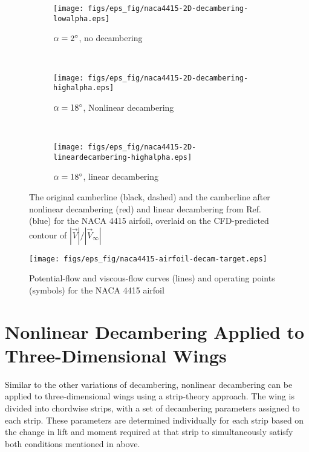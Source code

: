 \begin{figure*}[ht!]
    \centering
    \begin{subfigure}[t]{0.45\textwidth}
        \centering
        \texttt{[image: figs/eps\_fig/naca4415-2D-decambering-lowalpha.eps]}
        \caption{$\alpha = 2^\circ{}$, no decambering\label{sfig:nld-lowalpha}}
    \end{subfigure}
    ~
    \begin{subfigure}[t]{0.45\textwidth}
        \centering
        \texttt{[image: figs/eps\_fig/naca4415-2D-decambering-highalpha.eps]}
        \caption{$\alpha = 18^\circ{}$, Nonlinear decambering\label{sfig:nld-highalpha}}
    \end{subfigure}%
    ~
    \begin{subfigure}[t]{0.45\textwidth}
        \centering
        \texttt{[image: figs/eps\_fig/naca4415-2D-lineardecambering-highalpha.eps]}
        \caption{$\alpha = 18^\circ{}$, linear decambering\label{sfig:nld-linhighalpha}}
    \end{subfigure}
    \caption{The original camberline (black, dashed) and the camberline after nonlinear decambering (red) and linear decambering from Ref. \cite{Paul_Gopa_Iteration_Schemes} (blue) for the NACA 4415 airfoil, overlaid on the CFD-predicted contour of $|\vec{V}|/|\vec{V}_\infty|$\label{fig:nld-illustration}}
\end{figure*}

\begin{figure}[h!t]
    \centering
    \texttt{[image: figs/eps\_fig/naca4415-airfoil-decam-target.eps]}
    \caption{Potential-flow and viscous-flow curves (lines) and operating points (symbols) for the NACA 4415 airfoil}
    \label{fig:nld-targets}
\end{figure}

\section{Nonlinear Decambering Applied to Three-Dimensional Wings}
\label{sec:nld-3D}
Similar to the other variations of decambering, nonlinear decambering can be applied to three-dimensional wings using a strip-theory approach. The wing is divided into chordwise strips, with a set of decambering parameters assigned to each strip. These parameters are determined individually for each strip based on the change in lift and moment required at that strip to simultaneously satisfy both conditions mentioned in  above.

